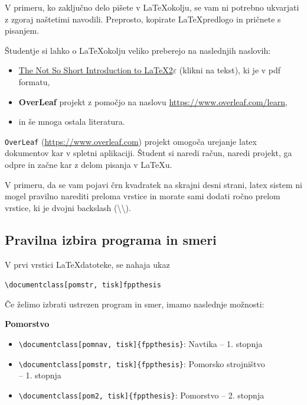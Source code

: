 \documentclass[12pt]{article}
\theoremstyle{definition}
\begin{document}
V primeru, ko zaključno delo pišete v \LaTeX okolju, se vam ni potrebno ukvarjati z zgoraj naštetimi navodili. Preprosto, kopirate \LaTeX predlogo in pričnete s pisanjem.

Študentje si lahko o \LaTeX okolju veliko preberejo na naslednjih naslovih:

\begin{itemize}[nosep]
	\item \href{https://tug.ctan.org/info/lshort/english/lshort.pdf}{The Not So Short Introduction to \LaTeX 2$\varepsilon$} (klikni na tekst), ki je v pdf formatu,
	\item \textbf{OverLeaf} projekt z pomočjo na naslovu \url{https://www.overleaf.com/learn},
	\item in še mnoga ostala literatura. 
\end{itemize}

\texttt{OverLeaf} (\url{https://www.overleaf.com}) projekt omogoča urejanje latex dokumentov kar v spletni aplikaciji. Študent si naredi račun, naredi projekt, ga odpre in začne kar z delom pisanja v \LaTeX u.

V primeru, da se vam pojavi črn kvadratek na skrajni desni strani, latex sistem ni mogel pravilno narediti preloma vrstice in morate sami dodati ročno prelom vrstice, ki je dvojni backslash (\textbackslash\textbackslash).


\subsection{Pravilna izbira programa in smeri}

V prvi vrstici \LaTeX datoteke, se nahaja ukaz

\texttt{\textbackslash documentclass[pomstr, tisk]{fppthesis}}

Če želimo izbrati ustrezen program in smer, imamo naslednje možnosti:

\textbf{Pomorstvo}
\begin{itemize}[nosep]
	\item \texttt{\textbackslash documentclass[pomnav, tisk]\{fppthesis\}}: Navtika -- 1. stopnja
	\item \texttt{\textbackslash documentclass[pomstr, tisk]\{fppthesis\}}: Pomorsko strojništvo\\
	-- 1. stopnja
	\item \texttt{\textbackslash documentclass[pom2, tisk]\{fppthesis\}}: Pomorstvo -- 2. stopnja
\end{itemize}
\end{document}
